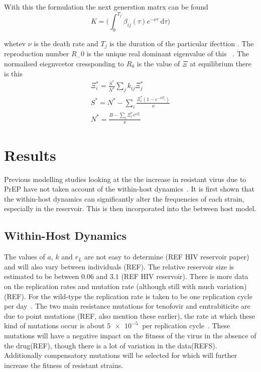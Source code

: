 \documentclass[DIV=15]{scrartcl}
\begin{document}
With this the formulation the next generstion  matrx  can be found 
  \begin{equation}
   K = \bigg( \int_0^{T_j}\beta_{ij}(\tau) e^{-\nu \tau} \ \text{d} \tau \bigg)
  \end{equation}

whetev 
$\nu$ is the death rate and $T_j$ is the duration of the particular ifecttion   .   The reproduction  number $R_-0$ is the unique real dominant eigenvalue of this~\cite{diekmann1990,diekmann2013} . The  normailsed eiegnvcetor  cressponding to  $R_0$ is the value of $ \Xi$ at equilibrium
  there is this 
 \begin{gather}
 \Xi_i^*  = \frac{S^*}{N^*} \sum_j k_{ij}\Xi_j^* \\
 S^* =  N^* - \sum_i \frac{\Xi _i^*(1-e^{-\nu T_i})}{\nu}\\
 N^* = \frac{B-\sum_i \Xi _i^* e^{\nu T_i}}{\nu}
 \end{gather}
 
 
 \section{Results}
  Previous modelling studies looking at the the increase in resistant virus due to PrEP have not taken account of the within-host dynamics~\cite{abbas2013}. It is first shown that the within-host dynamics can significantly alter the frequencies of each strain, especially in the reservoir. This is then incorporated into the between host model. 
  
  
  \subsection{Within-Host Dynamics}
  
  The values of $a$, $k$ and $r_L$ are not easy to determine (REF HIV reservoir paper) and will also vary between individuals (REF). The relative reservoir size is estimated to be between $0.06$ and $3.1$ (REF HIV reservoir). There is more data on the replication rates and mutation rate (although still with much variation) (REF). For the wild-type the replication rate is taken to  be one replication cycle  per day~\cite{perelson1996}.
The two main resistance mutations for tenofovir and emtrabiticite are due to point mutations (REF, also mention these earlier), the rate at which these kind of mutations occur is about $\SI{5e-5}{}$ per replication cycle~\cite{gao2004,cuevas2015,abram2010}. These mutations will have a negative impact on the fitness of the virus in the absence of the drug(REF), though there is a lot of variation in the data(REFS). Additionally compensatory mutations will  be selected for which will further increase the fitness of resistant strains.
\end{document}

